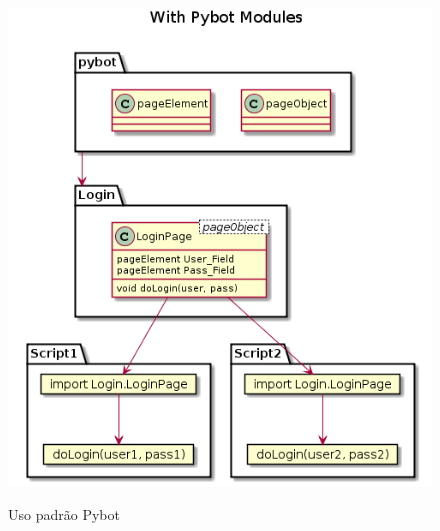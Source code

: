 \begin{apendicesenv}
    \begin{figure}[H]
        \vspace*{0,3cm}
        \centering
        \caption{Uso padrão Pybot}
        \includegraphics[width=1\textwidth]{./04-figuras/page_object_pybot}
        \label{fig:pybot_module}
    \end{figure}

\end{apendicesenv}